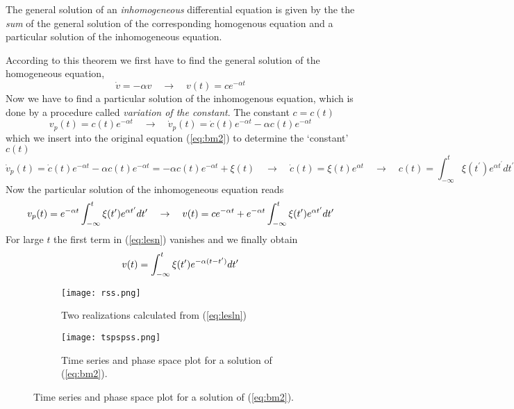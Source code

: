 \begin{theorem}
	The general solution of an \emph{inhomogeneous} differential equation is given by the the \emph{sum} of the general solution of the corresponding homogenous equation and a particular solution of the inhomogeneous equation.
\end{theorem}
According to this theorem we first have to find the general solution of the homogeneous equation,
\begin{equation}
	\dot{v}=-\alpha v\quad\rightarrow\quad v(t)=ce^{-\alpha t}
\end{equation}
Now we have to find a particular solution of the inhomogenous equation, which is done by a procedure called \emph{variation of the constant}.
The constant $c=c(t)$
\begin{equation}
	v_p(t)=c(t)e^{-\alpha t}\quad\rightarrow\quad \dot{v}_p(t)=\dot{c}(t)e^{-\alpha t}-\alpha c(t)e^{-\alpha t}
\end{equation}
which we insert into the original equation (\ref{eq:bm2}) to determine the ‘constant’ $c(t)$
\begin{equation}
	\dot{v}_p(t)=\dot{c}(t)e^{-\alpha t}-\alpha c(t)e^{-\alpha t}=-\alpha c(t)e^{-\alpha t}+\xi(t)\quad\rightarrow\quad \dot{c}(t)=\xi(t)e^{\alpha t}\quad\rightarrow\quad c(t)=\int_{-\infty}^t\xi(t^\prime)e^{\alpha t^\prime}dt^\prime
\end{equation}
Now the particular solution of the inhomogeneous equation reads
\begin{equation}{\label{eq:lesn}}
	v_p(t)=e^{-\alpha t}\int_{-\infty}^t\xi(t^\prime)e^{\alpha t^\prime}dt^\prime\quad\rightarrow\quad v(t)=ce^{-\alpha t}+e^{-\alpha t}\int_{-\infty}^t\xi(t^\prime)e^{\alpha t^\prime}dt^\prime
\end{equation}
For large $t$ the first term in (\ref{eq:lesn}) vanishes and we finally obtain
\begin{equation}{\label{eq:lesln}}
	v(t)=\int_{-\infty}^t\xi(t^\prime)e^{-\alpha(t-t^\prime)}dt^\prime
\end{equation}
\begin{figure}[H]
	\centering
	\begin{subfigure}{0.55\linewidth}
		\centering
		\texttt{[image: rss.png]}
		\caption{Two realizations calculated from (\ref{eq:lesln})}
		\label{fig:rss}
	\end{subfigure}
	\vline
	\begin{subfigure}{0.35\linewidth}
		\centering
		\texttt{[image: tspspss.png]}
		\caption{Time series and phase space plot for a solution of (\ref{eq:bm2}).}
		\label{fig:tspspss}
	\end{subfigure}
\end{figure}
